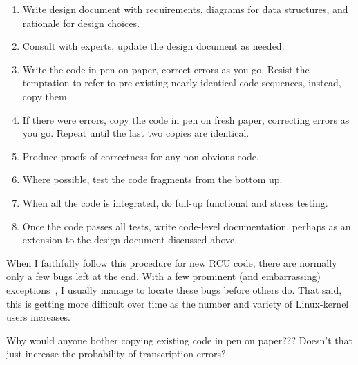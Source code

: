 \begin{enumerate}
\item	Write design document with requirements, diagrams for data structures,
	and rationale for design choices.
\item	Consult with experts, update the design document as needed.
\item	Write the code in pen on paper, correct errors as you go.
	Resist the temptation to refer to pre-existing nearly identical code
	sequences, instead, copy them.
\item	If there were errors, copy the code in pen on fresh paper, correcting
	errors as you go.
	Repeat until the last two copies are identical.
\item	Produce proofs of correctness for any non-obvious code.
\item	Where possible, test the code fragments from the bottom up.
\item	When all the code is integrated, do full-up functional and
	stress testing.
\item	Once the code passes all tests, write code-level documentation,
	perhaps as an extension to the design document discussed above.
\end{enumerate}

When I faithfully follow this procedure for new RCU code, there are
normally only a few bugs left at the end.
With a few prominent (and embarrassing)
exceptions~\cite{PaulEMcKenney2011RCU3.0trainwreck},
I usually manage to locate these bugs before others do.
That said, this is getting more difficult over time as the number and
variety of Linux-kernel users increases.

\QuickQuiz{}
	Why would anyone bother copying existing code in pen on paper???
	Doesn't that just increase the probability of transcription errors?
 \QuickQuizEnd

